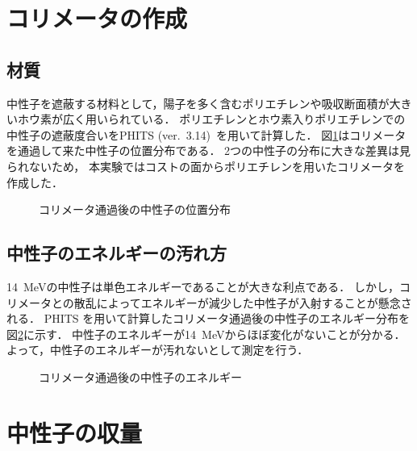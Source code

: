 \documentclass[../master]{subfiles}
\begin{document}
\section{コリメータの作成}
\subsection{材質}
中性子を遮蔽する材料として，陽子を多く含むポリエチレンや吸収断面積が大きいホウ素が広く用いられている．
ポリエチレンとホウ素入りポリエチレンでの中性子の遮蔽度合いをPHITS (ver.~3.14)~\cite{phits}を用いて計算した．
図\ref{collimator_xy_pos}はコリメータを通過して来た中性子の位置分布である．
2つの中性子の分布に大きな差異は見られないため，
本実験ではコストの面からポリエチレンを用いたコリメータを作成した．
\begin{figure}
  \centering
  \caption{コリメータ通過後の中性子の位置分布}
  \label{collimator_xy_pos}
\end{figure}

\subsection{中性子のエネルギーの汚れ方}
\SI{14}{\mega\electronvolt}の中性子は単色エネルギーであることが大きな利点である．
しかし，コリメータとの散乱によってエネルギーが減少した中性子が入射することが懸念される．
PHITS を用いて計算したコリメータ通過後の中性子のエネルギー分布を図\ref{fig::neutron_energy_dist}に示す．
中性子のエネルギーが\SI{14}{\mega\electronvolt}からほぼ変化がないことが分かる．
よって，中性子のエネルギーが汚れないとして測定を行う．
\begin{figure}
  \centering
  \caption{コリメータ通過後の中性子のエネルギー}
  \label{fig::neutron_energy_dist}
\end{figure}

\section{中性子の収量}
\end{document}
